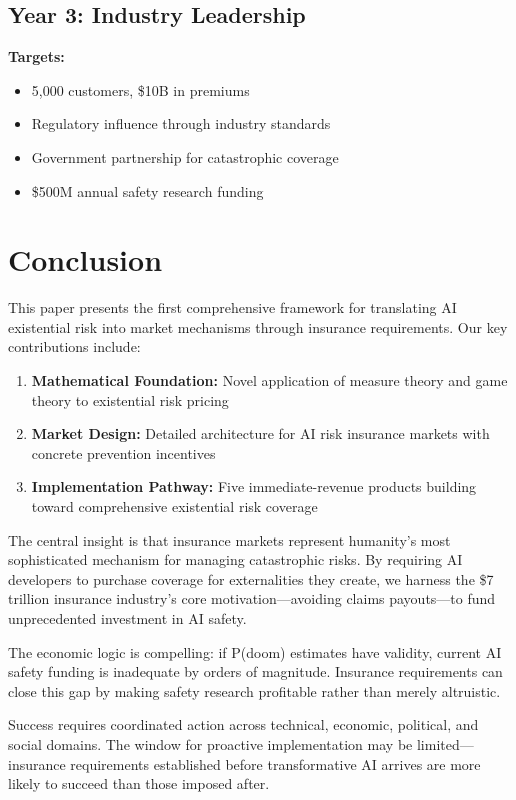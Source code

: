 \documentclass[11pt]{article}
\begin{document}
\subsection{Year 3: Industry Leadership}

\textbf{Targets:}
\begin{itemize}
   \item 5,000 customers, \$10B in premiums
   \item Regulatory influence through industry standards
   \item Government partnership for catastrophic coverage
   \item \$500M annual safety research funding
\end{itemize}

\section{Conclusion}

This paper presents the first comprehensive framework for translating AI existential risk into market mechanisms through insurance requirements. Our key contributions include:

\begin{enumerate}
   \item \textbf{Mathematical Foundation:} Novel application of measure theory and game theory to existential risk pricing
   \item \textbf{Market Design:} Detailed architecture for AI risk insurance markets with concrete prevention incentives
   \item \textbf{Implementation Pathway:} Five immediate-revenue products building toward comprehensive existential risk coverage
\end{enumerate}

The central insight is that insurance markets represent humanity's most sophisticated mechanism for managing catastrophic risks. By requiring AI developers to purchase coverage for externalities they create, we harness the \$7 trillion insurance industry's core motivation---avoiding claims payouts---to fund unprecedented investment in AI safety.

The economic logic is compelling: if P(doom) estimates have validity, current AI safety funding is inadequate by orders of magnitude. Insurance requirements can close this gap by making safety research profitable rather than merely altruistic.

Success requires coordinated action across technical, economic, political, and social domains. The window for proactive implementation may be limited---insurance requirements established before transformative AI arrives are more likely to succeed than those imposed after.
\end{document}
